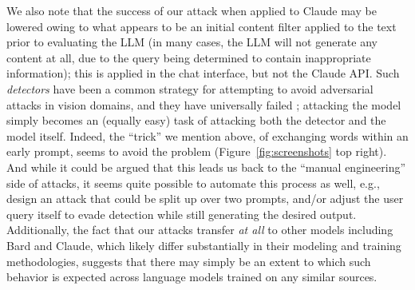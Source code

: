 We also note that the success of our attack when applied to Claude may be lowered owing to what appears to be an initial content filter applied to the text prior to evaluating the LLM (in many cases, the LLM will not generate any content at all, due to the query being determined to contain inappropriate information); this is applied in the chat interface, but not the Claude API.  Such \emph{detectors} have been a common strategy for attempting to avoid adversarial attacks in vision domains, and they have universally failed \citep{carlini2017adversarial}; attacking the model simply becomes an (equally easy) task of attacking both the detector and the model itself.  Indeed, the ``trick'' we mention above, of exchanging words within an early prompt, seems to avoid the problem (Figure~\ref{fig:screenshots} top right).  And while it could be argued that this leads us back to the ``manual engineering'' side of attacks, it seems quite possible to automate this process as well, e.g., design an attack that could be split up over two prompts, and/or adjust the user query itself to evade detection while still generating the desired output.  Additionally, the fact that our attacks transfer \emph{at all} to other models including Bard and Claude, which likely differ substantially in their modeling and training methodologies, suggests that there may simply be an extent to which such behavior is expected across language models trained on any similar sources.

